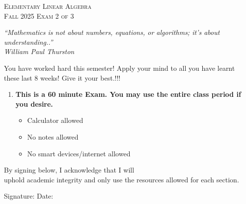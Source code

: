 \documentclass[12pt]{article}%
\begin{document}
\newcommand{\HRule}{\rule{\linewidth}{0.5mm}}

\begin{minipage}{0.8\textwidth}
\begin{flushright}
\centering
\textsc{\small Elementary Linear Algebra}\\[0.1cm] 
\textsc{\small Fall 2025 Exam 2 of 3
}\\[0.1cm] 
\end{flushright}
\end{minipage}

\vspace{1cm}
\begin{center}
    \textit{“Mathematics is not about numbers, equations, or algorithms; it's about understanding..”}
\\
\textit{William Paul Thurston }

\end{center}

\begin{center}
    You have worked hard this semester! Apply your mind to all you have learnt these last 8 weeks! Give it your best.!!!
\end{center}
\vspace{2cm}
\begin{enumerate}
    \item[1)] \textbf{This is a 60 minute Exam. You may use the entire class period if you desire.}
    \begin{itemize}
        \item[a)] Calculator allowed

        \item[b)] No notes allowed
        
        \item[c)] No smart devices/internet allowed
    \end{itemize}
    
\end{enumerate}
\vspace{1cm}
By signing below, I \hrulefill \hspace{0.2cm} acknowledge that I will\\
uphold academic integrity and only use the resources allowed for each section.

\vspace{1cm}
Signature:\hrulefill \hspace{2cm} Date:\hrulefill

\vspace{0.5cm}
\end{document}
